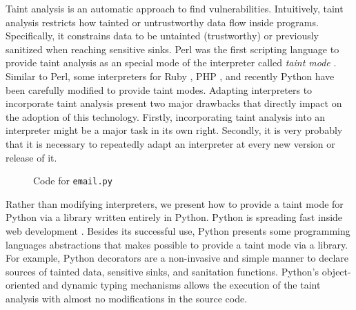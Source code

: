 \documentclass[oribibl]{llncs}
\begin{document}
Taint analysis is an automatic approach to find vulnerabilities.
Intuitively, taint analysis restricts how tainted or untrustworthy 
data flow inside programs. Specifically, it constrains data 
to be untainted (trustworthy) 
or previously sanitized when 
reaching sensitive sinks. 
Perl was the first scripting 
language to provide taint analysis 
as an special mode of the  
interpreter called \emph{taint mode} \cite{BekmanCholet2003}. 
Similar to Perl, some interpreters for 
 Ruby \cite{thomas2004prub}, PHP \cite{Nguyen05}, and 
recently Python \cite{KozlovPetukhov07} have been 
carefully modified to provide taint modes.
Adapting interpreters to incorporate taint analysis 
present two major drawbacks that directly 
impact on the adoption of this technology. 
Firstly, incorporating taint analysis into an interpreter 
might be a major task in its own right. Secondly, it is 
very probably that it is necessary to repeatedly adapt an  
interpreter at every new version or release of it.


\begin{wrapfigure}{r}{6.5cm}
\vspace{-25pt}
{\small{

\caption{\label{fig:example}Code for \texttt{email.py}}
}}
\vspace{-15pt}
\end{wrapfigure}
Rather than modifying interpreters, we present how to provide
a taint mode for Python via a library written entirely in Python. 
Python is spreading fast inside
web development \cite{WikiPython}. 
Besides its successful use, Python presents 
some programming languages abstractions that makes possible 
to provide a taint mode via a library. For example, 
Python decorators \cite{Lutz:1999:LP} are a non-invasive and simple 
manner to declare sources of tainted data, sensitive sinks, and 
sanitation functions. Python's 
object-oriented and dynamic typing mechanisms allows the 
execution of the taint analysis with almost no modifications in the
source code. 
\end{document}
